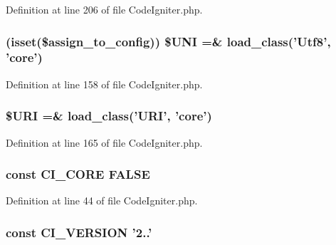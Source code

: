 Definition at line 206 of file Code\-Igniter.\-php.

\hypertarget{_code_igniter_8php_a0eedd12db0d3774c174f0dba59577357}{
\subsubsection[{\$\-U\-N\-I}]{ (isset(\$assign\-\_\-to\-\_\-config)) \$U\-N\-I =\& load\-\_\-class('Utf8', 'core')}}\label{_code_igniter_8php_a0eedd12db0d3774c174f0dba59577357}


Definition at line 158 of file Code\-Igniter.\-php.

\hypertarget{_code_igniter_8php_a630d83d898b39ad4568906284f7f5336}{
\subsubsection[{\$\-U\-R\-I}]{\setlength{\rightskip}{0pt plus 5cm}\$U\-R\-I =\& load\-\_\-class('U\-R\-I', 'core')}}\label{_code_igniter_8php_a630d83d898b39ad4568906284f7f5336}


Definition at line 165 of file Code\-Igniter.\-php.

\hypertarget{_code_igniter_8php_aefc9cd12024bd0164da3aeafe9635c30}{
\subsubsection[{C\-I\-\_\-\-C\-O\-R\-E}]{\setlength{\rightskip}{0pt plus 5cm}const C\-I\-\_\-\-C\-O\-R\-E F\-A\-L\-S\-E}}\label{_code_igniter_8php_aefc9cd12024bd0164da3aeafe9635c30}


Definition at line 44 of file Code\-Igniter.\-php.

\hypertarget{_code_igniter_8php_a32e3c3927ba8ec93df92327dfd85d564}{
\subsubsection[{C\-I\-\_\-\-V\-E\-R\-S\-I\-O\-N}]{\setlength{\rightskip}{0pt plus 5cm}const C\-I\-\_\-\-V\-E\-R\-S\-I\-O\-N '2..'}}\label{_code_igniter_8php_a32e3c3927ba8ec93df92327dfd85d564}


